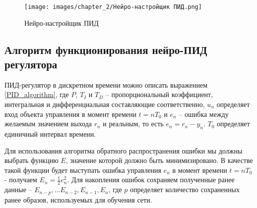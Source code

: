 \begin{figure}[H]
    \centering
    \texttt{[image: images/chapter\_2/Нейро-настройщик ПИД.png]}
    \caption{Нейро-настройщик ПИД}
    \label{fig:PID_neuro_tuner}
\end{figure}

\subsection{Алгоритм функционирования нейро-ПИД регулятора}

ПИД-регулятор в дискретном времени можно описать выражением \ref{PID_algorithm}, где $P$, $T_I$ и $T_D$ – пропорциональный коэффициент, интегральная и дифференциальная составляющие соответственно, $u_n$ определяет вход объекта управления в момент времени $t = n T_0$ и $e_n$ – ошибка между желаемым значением выхода $r_n$ и реальным, то есть $e_n = r_n - y_n$. $T_0$ определяет единичный интервал времени.

Для использования алгоритма обратного распространения ошибки мы должны выбрать функцию $E$, значение которой должно быть минимизировано. В качестве такой функции будет выступать ошибка управления $e_n$ в момент времени $t = n T_0$ - получаем $E_n = \frac{1}{2}e_n^2$.
Для накопления ошибок сохраняем полученные ранее данные – $E_{n-p},...E_{n-2},E_{n-1},E_n$, где $p$ определяет количество сохраненных ранее образов, используемых для обучения сети.

